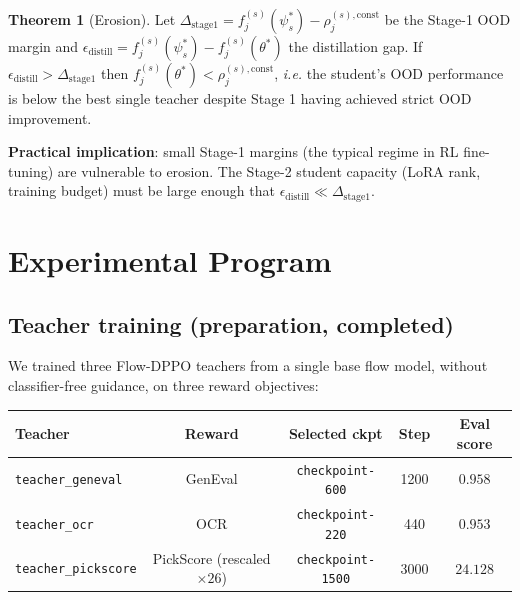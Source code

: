 \documentclass[11pt,a4paper]{article}
\newcommand{\const}{\mathrm{const}}
\theoremstyle{definition}
\newtheorem{theorem}{Theorem}
\begin{document}
\begin{theorem}[Erosion]
\label{thm:erosion}
Let $\Delta_{\text{stage1}} = f_j^{(s)}(\psi^*_s) - \rho_j^{(s),\const}$ be
the Stage-1 OOD margin and $\epsilon_{\text{distill}} = f_j^{(s)}(\psi^*_s)
- f_j^{(s)}(\theta^*)$ the distillation gap. If
$\epsilon_{\text{distill}} > \Delta_{\text{stage1}}$ then
$f_j^{(s)}(\theta^*) < \rho_j^{(s),\const}$, \emph{i.e.\@} the student's
OOD performance is below the best single teacher despite Stage 1
having achieved strict OOD improvement.
\end{theorem}

\textbf{Practical implication}: small Stage-1 margins (the typical regime
in RL fine-tuning) are vulnerable to erosion. The Stage-2 student capacity
(LoRA rank, training budget) must be large enough that
$\epsilon_{\text{distill}}\ll\Delta_{\text{stage1}}$.

\section{Experimental Program}
\label{sec:experiments}

\subsection{Teacher training (preparation, completed)}

We trained three Flow-DPPO teachers from a single base
flow model, without classifier-free guidance, on three reward objectives:

\begin{center}
\renewcommand{\arraystretch}{1.4}
\begin{tabular}{l|cccc}
\toprule
\textbf{Teacher} & \textbf{Reward} & \textbf{Selected ckpt} & \textbf{Step} & \textbf{Eval score} \\
\midrule
\texttt{teacher\_geneval}   & GenEval                         & \texttt{checkpoint-600}  & 1200 & $0.958$ \\
\texttt{teacher\_ocr}       & OCR                             & \texttt{checkpoint-220}  & 440  & $0.953$ \\
\texttt{teacher\_pickscore} & PickScore (rescaled $\times 26$) & \texttt{checkpoint-1500} & 3000 & $24.128$ \\
\bottomrule
\end{tabular}
\end{center}
\end{document}
